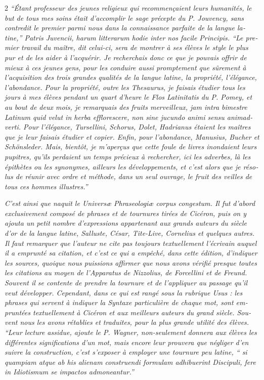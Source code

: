\begin{otherlanguage}{french}
\begin{multicols}{2}
\textit{“Étant professeur des jeunes religieux qui recommençaient leurs humanités, le but de tous mes soins était d’accomplir le sage précepte du P. Jouvency, sans contredit le premier parmi nous dans la connaissance parfaite de la langue latine,” Patris Juvencii, harum litterarum hodie inter nos facile Principis. “Le premier travail du maître, dit celui-ci, sera de montrer à ses élèves le style le plus pur et de les aider à l’acquérir. Je recherchais donc ce que je pouvais offrir de mieux à ces jeunes gens, pour les conduire aussi promptement que sûrement à l’acquisition des trois grandes qualités de la langue latine, la propriété, l’élégance, l’abondance. Pour la propriété, outre les Thesaurus, je faisais étudier tous les jours à mes élèves pendant un quart d’heure le Flos Latinitatis du P. Pomey, et au bout de deux mois, je remarquais des fruits merveilleux, jam intra bimestre Latinum quid velut in herba efflorescere, non sine jucundo animi sensu animadverti. Pour l’élégance, Tursellini, Schorus, Dolet, Hadrianus étaient les maîtres que je leur faisais étudier et copier. Enfin, pour l’abondance, Manusius, Bucher et Schönsleder. Mais, bientôt, je m’aperçus que cette foule de livres inondaient leurs pupitres, qu’ils perdaient un temps précieux à rechercher, ici les adverbes, là les épithètes ou les synonymes, ailleurs les développements, et c’est alors que je résolus de réunir avec ordre et méthode, dans un seul ouvrage, le fruit des veilles de tous ces hommes illustres.”}

\textit{C’est ainsi que naquit le Universæ Phraseologiæ corpus congestum. Il fut d’abord exclusivement composé de phrases et de tournures tirées de Cicéron, puis on y ajouta un petit nombre d’expressions appartenant aux grands auteurs du siècle d’or de la langue latine, Salluste, César, Tite-Live, Cornelius et quelques autres. Il faut remarquer que l’auteur ne cite pas toujours textuellement l’écrivain auquel il a emprunté sa citation, et c’est ce qui a empêché, dans cette édition, d’indiquer les sources, quoique nous puissions affirmer que nous avons vérifié presque toutes les citations au moyen de l’Apparatus de Nizzolius, de Forcellini et de Freund. Souvent il se contente de prendre la tournure et de l’appliquer au passage qu’il veut développer. Cependant, dans ce qui est rangé sous la rubrique Usus : les phrases qui servent à indiquer la Syntaxe particulière de chaque mot, sont empruntées textuellement à Cicéron et aux meilleurs auteurs du grand siècle. Souvent nous les avons rétablies et traduites, pour la plus grande utilité des élèves. “Leur lecture assidue, ajoute le P. Wagner, non-seulement donnera aux élèves les différentes significations d’un mot, mais encore leur prouvera que négliger d’en suivre la construction, c’est s’exposer à employer une tournure peu latine, “ si quampiam atque ab his alienam construendi formulam adhibuerint Discipuli, fere in Idiotismum se impactos admoneantur.”}


\end{multicols}
\end{otherlanguage}
